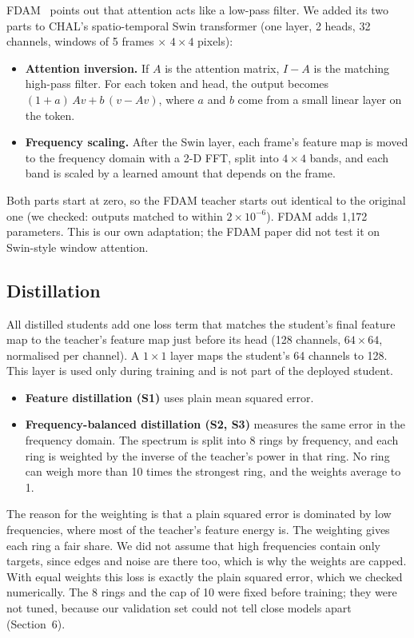 \documentclass[11pt,a4paper]{article}
\begin{document}
FDAM~\cite{fdam} points out that attention acts like a low-pass filter. We added its two parts to CHAL's
spatio-temporal Swin transformer (one layer, 2 heads, 32 channels, windows of 5 frames $\times$ $4\times4$ pixels):
\begin{itemize}
  \item \textbf{Attention inversion.} If $A$ is the attention matrix, $I-A$ is the matching high-pass filter. For
        each token and head, the output becomes $(1+a)\,Av + b\,(v - Av)$, where $a$ and $b$ come from a small
        linear layer on the token.
  \item \textbf{Frequency scaling.} After the Swin layer, each frame's feature map is moved to the frequency domain
        with a 2-D FFT, split into $4\times4$ bands, and each band is scaled by a learned amount that depends on
        the frame.
\end{itemize}
Both parts start at zero, so the FDAM teacher starts out identical to the original one (we checked: outputs
matched to within $2\times10^{-6}$). FDAM adds 1{,}172 parameters. This is our own adaptation; the FDAM paper did
not test it on Swin-style window attention.

\subsection{Distillation}

All distilled students add one loss term that matches the student's final feature map to the teacher's feature
map just before its head (128 channels, $64\times64$, normalised per channel). A $1\times1$ layer maps the
student's 64 channels to 128. This layer is used only during training and is not part of the deployed student.

\begin{itemize}
  \item \textbf{Feature distillation (S1)} uses plain mean squared error.
  \item \textbf{Frequency-balanced distillation (S2, S3)} measures the same error in the frequency domain. The
        spectrum is split into 8 rings by frequency, and each ring is weighted by the inverse of the teacher's
        power in that ring. No ring can weigh more than 10 times the strongest ring, and the weights average to 1.
\end{itemize}
The reason for the weighting is that a plain squared error is dominated by low frequencies, where most of the
teacher's feature energy is. The weighting gives each ring a fair share. We did not assume that high frequencies
contain only targets, since edges and noise are there too, which is why the weights are capped. With equal
weights this loss is exactly the plain squared error, which we checked numerically. The 8 rings and the cap of 10
were fixed before training; they were not tuned, because our validation set could not tell close models apart
(Section~6).
\end{document}
